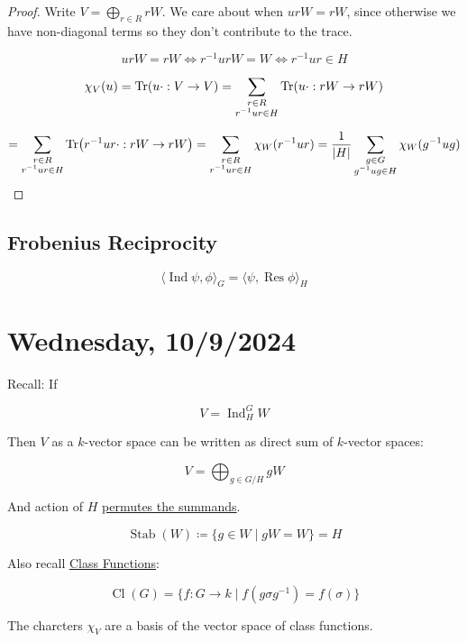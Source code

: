 \documentclass{article}
\theoremstyle{definition}
\begin{document}
\begin{proof}
    Write \(V = \bigoplus_{r\in R} rW\). We care about when \(ur W = rW\), since otherwise we have non-diagonal terms so they don't contribute to the trace.

    \[
        u r W = rW \iff r ^{-1} u r W = W \iff r ^{-1} u r \in H 
    \] 

    \[
        \chi_V (u) = \Tr (u\cdot: V \to V) = \sum_{\substack{r\in R \\ r ^{-1} u r \in H}} \Tr(u\cdot: rW \to rW)
    \]

    \[
        = \sum_{\substack{r\in R \\ r ^{-1} u r \in H}} \Tr(r ^{-1} u r\cdot: rW \to rW) = \sum_{\substack{r\in R \\ r ^{-1} u r \in H}} \chi_W (r ^{-1} u r) = \frac{1}{\vert H \vert} \sum_{\substack{g\in G \\ g ^{-1} u g \in H}} \chi_W (g ^{-1} u g)
    \]

\end{proof}

\subsection*{Frobenius Reciprocity}

\[
    \langle \operatorname{Ind} \psi , \phi \rangle _G = \langle \psi , \operatorname{Res} \phi \rangle _ H
\]

\section*{Wednesday, 10/9/2024}

Recall: If 

\[
    V =\operatorname{Ind}_H^G W
\]

Then \(V\) as a \(k\)-vector space can be written as direct sum of \(k\)-vector spaces:

\[
    V = \bigoplus_{g\in G / H} g W
\]

And action of \(H\) \underline{permutes the summands}.

\[
    \operatorname{Stab} (W) \coloneqq \{ g\in W \mid gW = W \} = H 
\]

Also recall \underline{Class Functions}:

\[
    \operatorname{Cl}(G) = \{ f : G \to k \mid f(g \sigma g ^{-1}) = f(\sigma) \} 
\]

The charcters \(\chi_V\) are a basis of the vector space of class functions.
\end{document}
